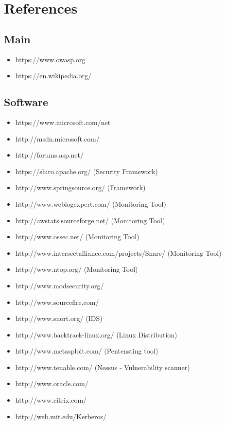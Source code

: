 \section*{References}

\subsection*{Main}
\begin{itemize}
\item https://www.owasp.org
\item https://en.wikipedia.org/

\end{itemize}

\subsection*{Software}
\begin{itemize}
\item https://www.microsoft.com/net
\item http://msdn.microsoft.com/
\item http://forums.asp.net/

\item https://shiro.apache.org/ (Security Framework)
\item http://www.springsource.org/ (Framework)

\item http://www.weblogexpert.com/ (Monitoring Tool)
\item http://awstats.sourceforge.net/ (Monitoring Tool)
\item http://www.ossec.net/ (Monitoring Tool)
\item http://www.intersectalliance.com/projects/Snare/ (Monitoring Tool)
\item http://www.ntop.org/ (Monitoring Tool)

\item http://www.modsecurity.org/
\item http://www.sourcefire.com/
\item http://www.snort.org/ (IDS)
\item http://www.backtrack-linux.org/ (Linux Distribution)
\item http://www.metasploit.com/ (Pentensting tool)
\item http://www.tenable.com/ (Nessus - Vulnerability scanner)
\item http://www.oracle.com/
\item http://www.citrix.com/

\item http://web.mit.edu/Kerberos/


\end{itemize}
